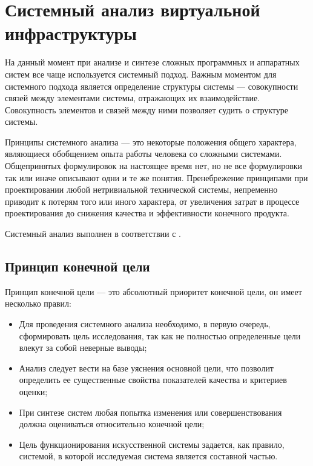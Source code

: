 \section{Системный анализ виртуальной инфраструктуры}

На данный момент при анализе и синтезе сложных программных и аппаратных систем все чаще используется системный подход.
Важным моментом для системного подхода является определение структуры системы --- совокупности связей между элементами системы, отражающих их взаимодействие.
Совокупность элементов и связей между ними позволяет судить о структуре системы.

Принципы системного анализа --- это некоторые положения общего характера, являющиеся обобщением опыта работы человека со сложными системами.
Общепринятых формулировок на настоящее время нет, но не все формулировки так или иначе описывают одни и те же понятия.
Пренебрежение принципами при проектировании любой нетривиальной технической системы, непременно приводит к потерям того или иного характера, от увеличения затрат в процессе проектирования до снижения качества и эффективности конечного продукта.

Системный анализ выполнен в соответствии с \cite{sys-analyz}.

\subsection{Принцип конечной цели} \label{goal}

Принцип конечной цели --- это абсолютный приоритет конечной цели, он имеет несколько правил:
\begin{itemize}
  \item Для проведения системного анализа необходимо, в первую очередь, сформировать цель исследования, так как не полностью определенные цели влекут за собой неверные выводы;
  \item Анализ следует вести на базе уяснения основной цели, что позволит определить ее существенные свойства показателей качества и критериев оценки;
  \item При синтезе систем любая попытка изменения или совершенствования должна оцениваться относительно конечной цели;
  \item Цель функционирования искусственной системы задается, как правило, системой, в которой исследуемая система является составной частью.
\end{itemize}

